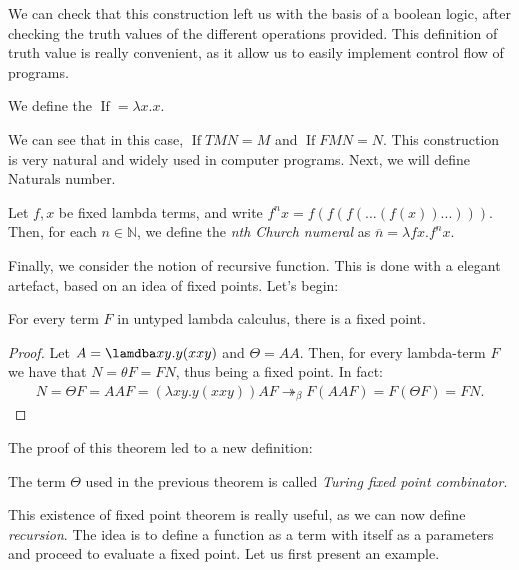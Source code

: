 We can check that this construction left us with the basis of a boolean logic, after checking the truth values of the different operations provided. This definition of truth value is really convenient, as it allow us to easily implement control flow of programs.

\begin{definition}
  We define the $\operatorname{If} = \lambda x.x$.  
\end{definition}

We can see that in this case, $\operatorname{If} T M N = M$ and $\operatorname{If} F M N = N$. This construction is very natural and widely used in computer programs. Next, we will define Naturals number. 

\begin{definition} \label{def:untyped-natural} 
Let $f,x$ be fixed lambda terms, and write $f^nx = f(f(f(...(f(x))...)))$. Then, for each $n \in \mathbb N$, we define the \emph{nth Church numeral} as $\overline n=\lambda fx.f^nx$.
\end{definition}

Finally, we consider the notion of recursive function. This is done with a elegant artefact, based on an idea of fixed points. Let's begin:



\begin{theorem}
  For every term $F$ in untyped lambda calculus, there is a fixed point.
\end{theorem}
\begin{proof}
  Let $A=\lamdba xy.y(xxy)$ and $\Theta =AA$. Then, for every lambda-term $F$ we have that $N=\theta F = FN$, thus being a fixed point. In fact:
  \begin{align*}
    N = \Theta F = AAF = (\lambda xy.y(xxy))AF \twoheadrightarrow_\beta F(AAF) = F(\Theta F) = FN.
  \end{align*}
\end{proof}
The proof of this theorem led to a new definition:

\begin{definition}
  The term $\Theta$ used in the previous theorem is called \emph{Turing fixed point combinator}.
\end{definition}

This existence of fixed point theorem is really useful, as we can now define \emph{recursion}. The idea is to define a function as a term with itself as a parameters and proceed to evaluate a fixed point. Let us first present an example.

